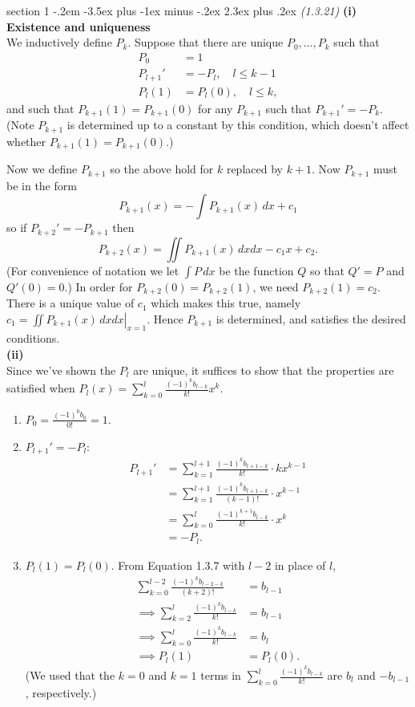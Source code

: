 \documentclass[12pt]{article}
\makeatletter
\theoremstyle{norm}
\newcommand{\subprob}[1]{\noindent\textbf{#1}\\}
\newenvironment{problem}{\@startsection
       {section}
       {1}
       {-.2em}
       {-3.5ex plus -1ex minus -.2ex}
       {2.3ex plus .2ex}
       {\pagebreak[3]%
       \large\bf\noindent{Problem }
       }
       }
       {%
       }
\makeatother
\begin{document}
\begin{problem}{\it(1.3.21)}
\subprob{(i) Existence and uniqueness}
We inductively define $P_k$. Suppose that there are unique $P_0,\ldots, P_k$ such that
\begin{align*}
P_0&=1\\
P_{l+1}'&=-P_l,\quad l\leq k-1\\
P_l(1)&=P_l(0),\quad l\leq k,
\end{align*}
and such that $P_{k+1}(1)=P_{k+1}(0)$ for any $P_{k+1}$ such that $P_{k+1}'=-P_k$. (Note $P_{k+1}$ is determined up to a constant by this condition, which doesn't affect whether $P_{k+1}(1)=P_{k+1}(0)$.)

Now we define $P_{k+1}$ so the above hold for $k$ replaced by $k+1$. Now $P_{k+1}$ must be in the form
\[P_{k+1}(x)=-\int P_{k+1}(x)\,dx+c_1\]
so if $P_{k+2}'=-P_{k+1}$ then
\[P_{k+2}(x)=\iint P_{k+1}(x)\,dxdx-c_1x+c_2.\]
(For convenience of notation we let $\int P\,dx$ be the function $Q$ so that $Q'=P$ and $Q'(0)=0$.)
In order for $P_{k+2}(0)=P_{k+2}(1)$, we need $P_{k+2}(1)=c_2$. There is a unique value of $c_1$ which makes this true, namely $c_1=\left.\iint P_{k+1}(x)\,dxdx\right|_{x=1}$. Hence $P_{k+1}$ is determined, and satisfies the desired conditions.\\

\subprob{(ii)}
Since we've shown the $P_l$ are unique, it suffices to show that the properties are satisfied when $P_l(x)=\sum_{k=0}^l \frac{(-1)^kb_{l-k}}{k!} x^k$.
\begin{enumerate}
\item
$P_0=\frac{(-1)^0b_0}{0!}=1$.
\item $P_{l+1}'=-P_l$:
\begin{align*}
P_{l+1}'&=\sum_{k=1}^{l+1}\frac{(-1)^kb_{l+1-k}}{k!}\cdot kx^{k-1}\\
&=\sum_{k=1}^{l+1}\frac{(-1)^kb_{l+1-k}}{(k-1)!}\cdot x^{k-1}\\
&=\sum_{k=0}^{l}\frac{(-1)^{k+1}b_{l-k}}{k!}\cdot x^{k}\\
&=-P_l.
\end{align*}
\item
$P_l(1)=P_l(0)$. From Equation 1.3.7 with $l-2$ in place of $l$,
\begin{align*}
\sum_{k=0}^{l-2}\frac{(-1)^k b_{l-2-k}}{(k+2)!}&=b_{l-1}\\
\implies \sum_{k=2}^{l}\frac{(-1)^k b_{l-k}}{k!}&=b_{l-1}\\
\implies \sum_{k=0}^l\frac{(-1)^kb_{l-k}}{k!}&=b_l\\
\implies P_l(1)&=P_l(0).
\end{align*}
(We used that the $k=0$ and $k=1$ terms in $\sum_{k=0}^l\frac{(-1)^kb_{l-k}}{k!}$ are $b_l$ and $-b_{l-1}$, respectively.) 
\end{enumerate}
\end{problem}
\end{document}
